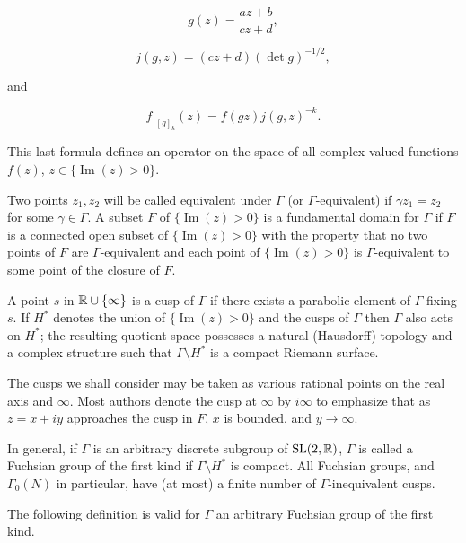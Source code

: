 \begin{equation}\label{eq:1.1}
g(z) = \frac{az + b}{cz + d},\tag{1.1}
\end{equation}

\begin{equation}\label{eq:1.2}
j(g,z) = (cz + d)(\det g)^{-1/2},\tag{1.2}
\end{equation}

and

\begin{equation}\label{eq:1.3}
f\big|_{[g]_k}(z) = f(gz) j(g,z)^{-k}.\tag{1.3}
\end{equation}

This last formula defines an operator on the space of all complex-valued functions $f(z)$, $z \in \{\operatorname{Im}(z) > 0\}$.

Two points $z_1, z_2$ will be called equivalent under $\Gamma$ (or $\Gamma$-equivalent) if $\gamma z_1 = z_2$ for some $\gamma \in \Gamma$. A subset $F$ of $\{\operatorname{Im}(z) > 0\}$ is a fundamental domain for $\Gamma$ if $F$ is a connected open subset of $\{\operatorname{Im}(z) > 0\}$ with the property that no two points of $F$ are $\Gamma$-equivalent and each point of $\{\operatorname{Im}(z) > 0\}$ is $\Gamma$-equivalent to some point of the closure of $F$.

A point $s$ in $\mathbb{R} \cup \{\infty\}$ is a cusp of $\Gamma$ if there exists a parabolic element of $\Gamma$ fixing $s$. If $H^*$ denotes the union of $\{\operatorname{Im}(z) > 0\}$ and the cusps of $\Gamma$ then $\Gamma$ also acts on $H^*$; the resulting quotient space possesses a natural (Hausdorff) topology and a complex structure such that $\Gamma \setminus H^*$ is a compact Riemann surface.

The cusps we shall consider may be taken as various rational points on the real axis and $\infty$. Most authors denote the cusp at $\infty$ by $i\infty$ to emphasize that as $z = x + iy$ approaches the cusp in $F$, $x$ is bounded, and $y \to \infty$.

In general, if $\Gamma$ is an arbitrary discrete subgroup of $\operatorname{SL}(2,\mathbb{R})$, $\Gamma$ is called a Fuchsian group of the first kind if $\Gamma \setminus H^*$ is compact. All Fuchsian groups, and $\Gamma_0(N)$ in particular, have (at most) a finite number of $\Gamma$-inequivalent cusps.

The following definition is valid for $\Gamma$ an arbitrary Fuchsian group of the first kind.


